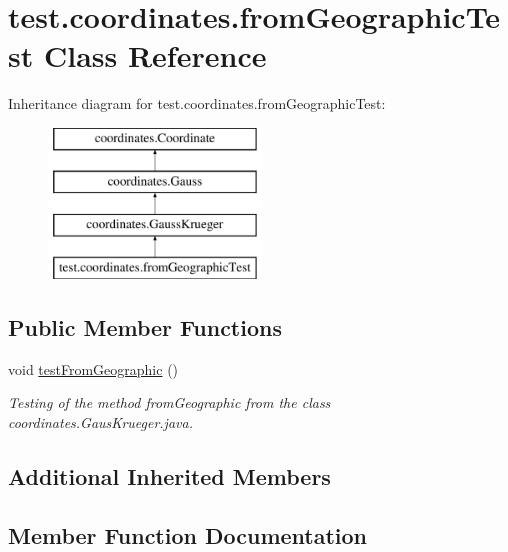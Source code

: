 \hypertarget{classtest_1_1coordinates_1_1from_geographic_test}{}\section{test.\+coordinates.\+from\+Geographic\+Test Class Reference}
\label{classtest_1_1coordinates_1_1from_geographic_test}
Inheritance diagram for test.\+coordinates.\+from\+Geographic\+Test\+:\begin{figure}[H]
\begin{center}
\leavevmode
\includegraphics[height=4.000000cm]{classtest_1_1coordinates_1_1from_geographic_test}
\end{center}
\end{figure}
\subsection*{Public Member Functions}
\begin{DoxyCompactItemize}
\item 
void \hyperlink{classtest_1_1coordinates_1_1from_geographic_test_a8e844647b68ce871522a86806320f7ef}{test\+From\+Geographic} ()
\begin{DoxyCompactList}\small\item\em Testing of the method from\+Geographic from the class coordinates.\+Gaus\+Krueger.\+java. \end{DoxyCompactList}\end{DoxyCompactItemize}
\subsection*{Additional Inherited Members}


\subsection{Member Function Documentation}
\mbox{\label{classtest_1_1coordinates_1_1from_geographic_test_a8e844647b68ce871522a86806320f7ef}} 

